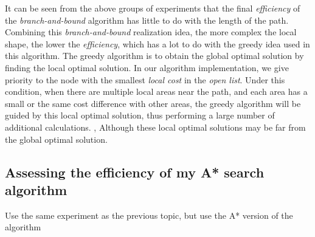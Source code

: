 \documentclass[
]{article}
\begin{document}
It can be seen from the above groups of experiments that the final
\emph{efficiency} of the \emph{branch-and-bound} algorithm has little to
do with the length of the path. Combining this \emph{branch-and-bound}
realization idea, the more complex the local shape, the lower the
\emph{efficiency}, which has a lot to do with the greedy idea used in
this algorithm. The greedy algorithm is to obtain the global optimal
solution by finding the local optimal solution. In our algorithm
implementation, we give priority to the node with the smallest
\emph{local cost} in the \emph{open list}. Under this condition, when
there are multiple local areas near the path, and each area has a small
or the same cost difference with other areas, the greedy algorithm will
be guided by this local optimal solution, thus performing a large number
of additional calculations. , Although these local optimal solutions may
be far from the global optimal solution.

\hypertarget{header-n406}{%
\subsection{Assessing the efficiency of my A* search
algorithm}\label{header-n406}}

Use the same experiment as the previous topic, but use the A* version of
the algorithm
\end{document}
